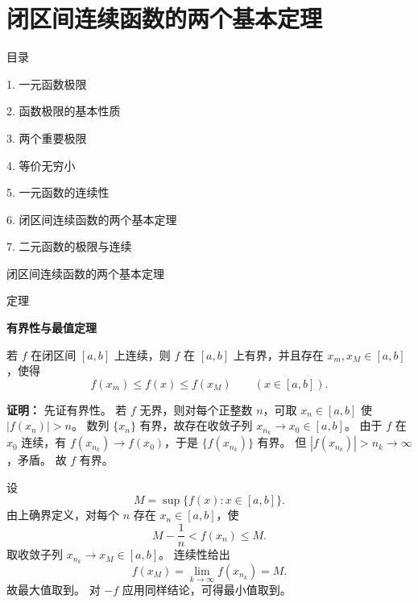 \documentclass[aspectratio=169,10pt,fontset=fandol]{ctexbeamer}
\newenvironment{warning}{\par\noindent\textbf{注：}\quad}{\par\vspace{0.8em}}
\begin{document}
\section{闭区间连续函数的两个基本定理}
\begin{frame}[t,fragile]{目录}
\normalsize
{\color{black}\normalsize 1. 一元函数极限\par}\vspace{0.3em}
{\color{black}\normalsize 2. 函数极限的基本性质\par}\vspace{0.3em}
{\color{black}\normalsize 3. 两个重要极限\par}\vspace{0.3em}
{\color{black}\normalsize 4. 等价无穷小\par}\vspace{0.3em}
{\color{black}\normalsize 5. 一元函数的连续性\par}\vspace{0.3em}
{\color{blue}\normalsize 6. 闭区间连续函数的两个基本定理\par}\vspace{0.3em}
{\color{gray!40}\normalsize 7. 二元函数的极限与连续\par}\vspace{0.3em}
\end{frame}
\begin{frame}[t,fragile]{闭区间连续函数的两个基本定理}
\footnotesize
\begin{block}{定理}
{\footnotesize
\textbf{有界性与最值定理}\par

若 $f$ 在闭区间 $[a,b]$ 上连续，则 $f$ 在 $[a,b]$ 上有界，并且存在 $x_m,x_M\in[a,b]$，使得
\[
f(x_m)\le f(x)\le f(x_M)\qquad (x\in[a,b]).
\]

}
\end{block}
\pause
{\footnotesize
\textbf{证明：}
先证有界性。 若 $f$ 无界，则对每个正整数 $n$，可取 $x_n\in[a,b]$ 使 $|f(x_n)|>n$。 数列 $\{x_n\}$ 有界，故存在收敛子列 $x_{n_k}\to x_0\in[a,b]$。 由于 $f$ 在 $x_0$ 连续，有 $f(x_{n_k})\to f(x_0)$，于是 $\{f(x_{n_k})\}$ 有界。 但 $|f(x_{n_k})|>n_k\to\infty$，矛盾。 故 $f$ 有界。

设
\[
M=\sup\{f(x):x\in[a,b]\}.
\]
由上确界定义，对每个 $n$ 存在 $x_n\in[a,b]$，使
\[
M-\frac1n<f(x_n)\le M.
\]
取收敛子列 $x_{n_k}\to x_M\in[a,b]$。 连续性给出
\[
f(x_M)=\lim_{k\to\infty}f(x_{n_k})=M.
\]
故最大值取到。 对 $-f$ 应用同样结论，可得最小值取到。

}
\end{frame}
\end{document}
